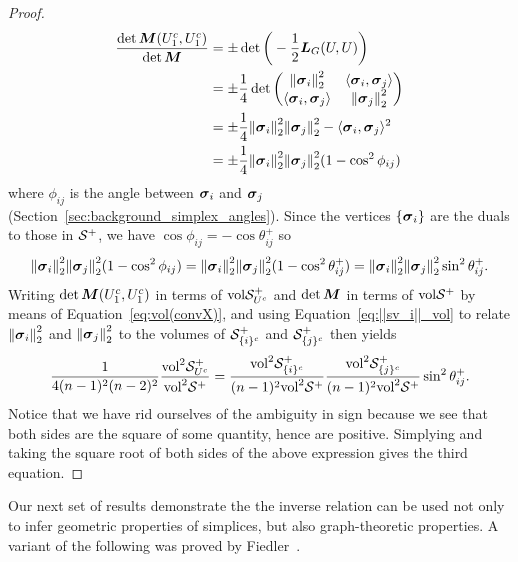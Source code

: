 \begin{proof}
	\begin{align*}
	\frac{\det\M(U_1^c,U_1^c)}{\det \M} &= \pm \det \bigg(-\frac{1}{2}\L_G(U,U)\bigg) \\
	&= 
	\pm \frac{1}{4}\det\begin{pmatrix}
	\norm{\sv_i}_2^2 & \la \sv_i,\sv_j\ra \\
	\la \sv_i,\sv_j\ra & \norm{\sv_j}_2^2 
	\end{pmatrix} \\
	&=\pm \frac{1}{4}\norm{\sv_i}_2^2\norm{\sv_j}_2^2 - \la \sv_i,\sv_j\ra^2 \\
	&= \pm\frac{1}{4}\norm{\sv_i}_2^2\norm{\sv_j}_2^2(1 - \cos^2\phi_{ij})
	\end{align*}
	where $\phi_{ij}$ is the angle between $\vb*{\sigma}_i$ and $\vb*{\sigma}_j$ (Section~\ref{sec:background_simplex_angles}). Since the vertices $\{\vb*{\sigma}_i\}$ are the  duals  to those in $\mathcal{S}^+$, we have $\cos\phi_{ij}=-\cos\theta_{ij}^+$  so \[\norm{\vb*{\sigma}_i}_2^2\norm{\vb*{\sigma}_j}_2^2(1 - \cos^2\phi_{ij}) = \norm{\vb*{\sigma}_i}_2^2\norm{\vb*{\sigma}_j}_2^2(1 - \cos^2\theta_{ij}^+) =  \norm{\vb*{\sigma}_i}_2^2\norm{\vb*{\sigma}_j}_2^2\sin^2\theta_{ij}^+.\]   
	Writing $\det\M(U_1^c,U_1^c)$  in terms of $\textnormal{vol}\mathcal{S}_{U^c}^+$ and $\det \M$  in terms of $\textnormal{vol}\mathcal{S}^+$ by  means of Equation~\eqref{eq:vol(convX)}, and using Equation~\eqref{eq:||sv_i||_vol} to relate $\norm{\vb*{\sigma}_i}_2^2$ and $\norm{\vb*{\sigma}_j}_2^2$  to  the volumes of $\mathcal{S}_{\{i\}^c}^+$  and $\mathcal{S}_{\{j\}^c}^+$ then yields 
	\begin{align*}
	\frac{1}{4(n-1)^2(n-2)^2}\frac{\textnormal{vol}^2\mathcal{S}_{U^c}^+}{\textnormal{vol}^2\mathcal{S}^+} =  \frac{\textnormal{vol}^2\mathcal{S}_{\{i\}^c}^+}{(n-1)^2\textnormal{vol}^2\mathcal{S}^+}\frac{\textnormal{vol}^2\mathcal{S}_{\{j\}^c}^+}{(n-1)^2\textnormal{vol}^2\mathcal{S}^+}\sin^2\theta_{ij}^+.
	\end{align*}
	Notice that we have rid ourselves  of the ambiguity in sign because we see that both  sides are the square of some quantity, hence are  positive. 
	Simplying and taking the square root of both sides of the above expression gives the third equation.
\end{proof}





Our next set of results demonstrate the the inverse relation can be used not only to infer geometric properties of simplices, but also graph-theoretic properties. A variant of the following  was proved by Fiedler~\cite{fiedler2011matrices}. 


